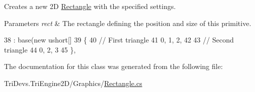 Creates a new 2\-D \hyperlink{class_tri_devs_1_1_tri_engine2_d_1_1_graphics_1_1_rectangle}{Rectangle} with the specified settings. 


\begin{DoxyParams}{Parameters}
{\em rect} & The rectangle defining the position and size of this primitive.\\
\hline
\end{DoxyParams}

\begin{DoxyCode}
38             : base(\textcolor{keyword}{new} ushort[]
39             \{
40                 \textcolor{comment}{// First triangle}
41                 0, 1, 2,
42 
43                 \textcolor{comment}{// Second triangle}
44                 0, 2, 3
45             \}, 
\end{DoxyCode}


The documentation for this class was generated from the following file\-:\begin{DoxyCompactItemize}
\item 
Tri\-Devs.\-Tri\-Engine2\-D/\-Graphics/\hyperlink{_graphics_2_rectangle_8cs}{Rectangle.\-cs}\end{DoxyCompactItemize}
